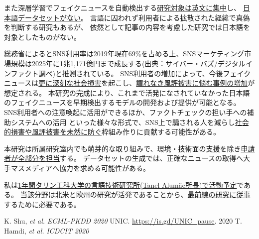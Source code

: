 また深層学習でフェイクニュースを自動検出する\underline{研究対象は英文に集中}し、
\underline{日本語データセットがない}。
言語に囚われず利用者による拡散された経緯で真偽を判断する研究もあるが\cite{tarek2020}、
依然として記事の内容を考慮した研究では日本語を対象としたものがない。

総務省によるとSNS利用率は2019年現在69\%を占める上、SNSマーケティング市場規模は2025年に1兆1,171億円まで成長する(出典：サイバー・バズ/デジタルインファクト調べ)と推測されている。
SNS利用者の増加によって、今後フェイクニュースは\underline{更に深刻な社会損害}を起こし、\underline{謂れなき風評被害に悩む事例の増加}が想定される。
本研究の完成により、これまで活発になされていなかった日本語のフェイクニュースを早期検出するモデルの開発および提供が可能となる。
SNS利用者への注意喚起に活用ができるほか、ファクトチェックの担い手への補助システムへの活用
といった様々な形式で、SNS上で騙される人を減らし\underline{社会的損害や風評被害を未然に防ぐ}枠組み作りに貢献する可能性がある。


本研究は所属研究室内でも萌芽的な取り組みで、環境・技術面の支援を除き\underline{申請者が全部分を担当}する。
データセットの生成では、正確なニュースの取得へ大手マスメディアへ協力を求める可能性がある。

私は\underline{1年間タリン工科大学の言語技術研究所(Tanel Alumäe所長)で活動予定}である。
当該分野は北米と欧州の研究が活発であることから、\underline{最前線の研究に従事}するために必要である。

{\footnotesize 
\begin{twobibliography}{99}
    \setlength{\parskip}{0cm}
    \setlength{\itemsep}{0cm}
     K. Shu, \textit{et al.} \textit{ECML-PKDD 2020}
     UNIC. \url{https://is.gd/UNIC_pause}. 2020
     T. Hamdi, \textit{et al.} \textit{ICDCIT 2020}
\end{twobibliography}
}


